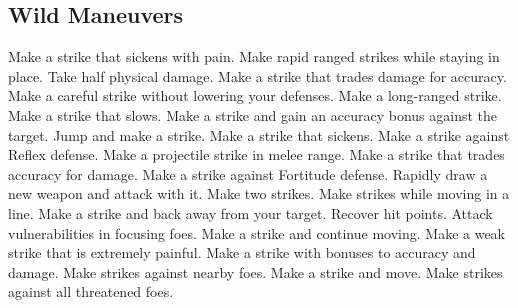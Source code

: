 \subsection{Wild Maneuvers}\label{Wild Maneuvers}
\begin{spelllist}
 Make a strike that sickens with pain.
 Make rapid ranged strikes while staying in place.
 Take half physical damage.
 Make a strike that trades damage for accuracy.
 Make a careful strike without lowering your defenses.
 Make a long-ranged strike.
 Make a strike that slows.
 Make a strike and gain an accuracy bonus against the target.
 Jump and make a strike.
 Make a strike that sickens.
 Make a strike against Reflex defense.
 Make a projectile strike in melee range.
 Make a strike that trades accuracy for damage.
 Make a strike against Fortitude defense.
 Rapidly draw a new weapon and attack with it.
 Make two strikes.
 Make strikes while moving in a line.
 Make a strike and back away from your target.
 Recover hit points.
 Attack vulnerabilities in focusing foes.
 Make a strike and continue moving.
 Make a weak strike that is extremely painful.
 Make a strike with bonuses to accuracy and damage.
 Make strikes against nearby foes.
 Make a strike and move.
 Make strikes against all threatened foes.
\end{spelllist}
